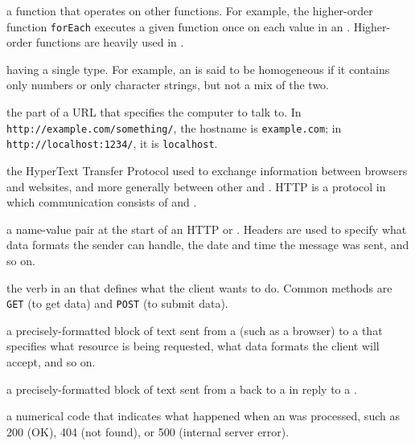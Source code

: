 \begin{description}
a function that operates on other functions. For example, the higher-order
function \texttt{forEach} executes a given function once on each value in an
. Higher-order functions are heavily used in .

having a single type. For example, an  is said to be
homogeneous if it contains only numbers or only character strings, but not a
mix of the two.

the part of a URL that specifies the computer to talk to. In
\texttt{http://example.com/something/}, the hostname is \texttt{example.com}; in
\texttt{http://localhost:1234/}, it is \texttt{localhost}.

the HyperText Transfer Protocol used to exchange information between browsers
and websites, and more generally between other  and
. HTTP is a  protocol in which
communication consists of  and
.

a name-value pair at the start of an HTTP  or
. Headers are used to specify what data formats
the sender can handle, the date and time the message was sent, and so on.

the verb in an  that defines what the client
wants to do. Common methods are \texttt{GET} (to get data) and \texttt{POST} (to submit
data).

a precisely-formatted block of text sent from a  (such as a
browser) to a  that specifies what resource is being
requested, what data formats the client will accept, and so on.

a precisely-formatted block of text sent from a  back to a
 in reply to a .

a numerical code that indicates what happened when an  was processed, such as 200 (OK), 404 (not found), or
500 (internal server error).


\end{description}
